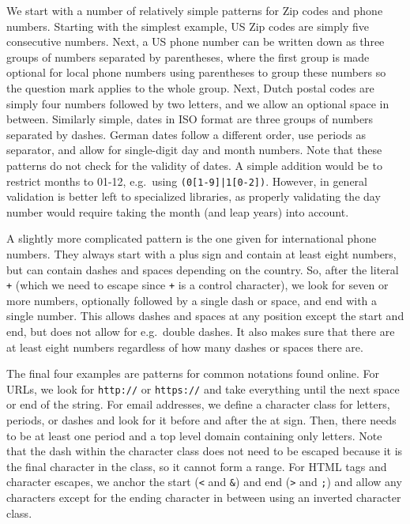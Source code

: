 We start with a number of relatively simple patterns for Zip codes and phone numbers.
Starting with the simplest example, US Zip codes are simply five consecutive numbers.
Next, a US phone number can be written down as three groups of numbers separated by parentheses,
where the first group is made optional for local phone numbers using parentheses to group these numbers so the question mark applies to the whole group.
Next, Dutch postal codes are simply four numbers followed by two letters, and we allow an optional space in between.
Similarly simple, dates in ISO format are three groups of numbers separated by dashes.
German dates follow a different order, use periods as separator, and allow for single-digit day and month numbers.
Note that these patterns do not check for the validity of dates.
A simple addition would be to restrict months to 01-12, e.g.\ using \verb+(0[1-9]|1[0-2])+.
However, in general validation is better left to specialized libraries, as properly validating the day number would require taking the month (and leap years) into account.

A slightly more complicated pattern is the one given for international phone numbers.
They always start with a plus sign and contain at least eight numbers, but can contain dashes and spaces depending on the country.
So, after the literal \verb|+| (which we need to escape since \verb|+| is a control character),
we look for seven or more numbers, optionally followed by a single dash or space, and end with a single number.
This allows dashes and spaces at any position except the start and end, but does not allow for e.g.\ double dashes.
It also makes sure that there are at least eight numbers regardless of how many dashes or spaces there are.

The final four examples are patterns for common notations found online.
For URLs, we look for \verb|http://| or \verb|https://| and take everything until the next space or end of the string.
For email addresses, we define a character class for letters, periods, or dashes and look for it before and after the at sign.
Then, there needs to be at least one period and a top level domain containing only letters.
Note that the dash within the character class does not need to be escaped because it is the final character in the class, so it cannot form a range.
For HTML tags and character escapes, we anchor the start (\verb|<| and \verb|&|) and end (\verb|>| and \verb|;|) and allow any characters except for the ending character in between
using an inverted character class.


